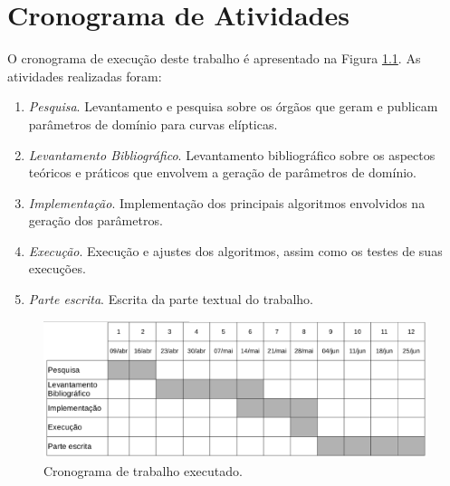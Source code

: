 \chapter{Cronograma de Atividades}

O cronograma de execução deste trabalho é apresentado na Figura \ref{fig:cronograma}. As atividades realizadas foram:

\begin{enumerate}
\item \textit{Pesquisa}. Levantamento e pesquisa sobre os órgãos que geram e publicam parâmetros de domínio para curvas elípticas.
\item \textit{Levantamento Bibliográfico}. Levantamento bibliográfico sobre os aspectos teóricos e práticos que envolvem a geração de parâmetros de domínio.
\item \textit{Implementação}. Implementação dos principais algoritmos envolvidos na geração dos parâmetros.
\item \textit{Execução}. Execução e ajustes dos algoritmos, assim como os testes de suas execuções.
\item \textit{Parte escrita}. Escrita da parte textual do trabalho.
\end{enumerate}

\begin{figure}[h!]
\begin{center}
\includegraphics[scale=0.3, bb=0 0 1349 483]{figuras/cronograma.eps}
\end{center}
\caption{Cronograma de trabalho executado.}
\label{fig:cronograma}
\end{figure}
